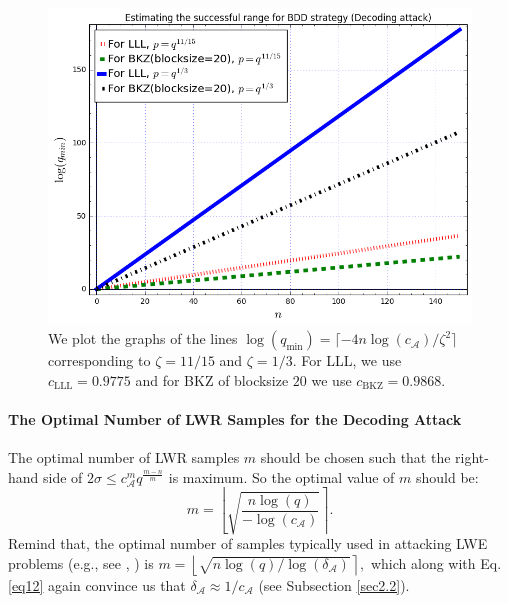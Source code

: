 \documentclass{cta-author}
\begin{document}
\begin{figure}[t]
	\centering
	\includegraphics[scale=0.437, bb=0 0 560 430]{picture.png}
	\caption{We plot the graphs of the lines $\log (q_{\text{min}})=\lceil-4n  \log (c_{\mathcal{A}})/\zeta^2 \rceil$ corresponding to $\zeta=11/15$ and $\zeta=1/3$. For LLL, we use $c_{\text{LLL}}=0.9775$ and for BKZ of blocksize $20$ we use $c_{\text{BKZ}}=0.9868$.}
	\label{fig:success_range}
\end{figure}
\paragraph{The Optimal Number of LWR Samples for the Decoding Attack}
The optimal number of LWR samples $m$ should be chosen such that the right-hand side of
$2\sigma \leq c_{\mathcal{A}} ^{m} q^{\frac{m-n}{m}}$ is maximum.
So the optimal value of $m$ should be:
\begin{equation}\label{eq12} 
m=\left \lfloor \sqrt{\frac{n\log (q)}{- \log (c_{\mathcal{A}})}} \right\rceil.
\end{equation}
Remind that, the optimal number of samples typically used in attacking LWE problems (e.g., see \cite{LP11}, \cite{MR09}) is
$m=\left \lfloor \sqrt{n\log (q)/\log (\delta_{\mathcal{A}})} \right\rceil,$
which along with Eq. \eqref{eq12} again convince us that $\delta_{\mathcal{A}} \approx 1/c_{\mathcal{A}}$ (see Subsection \ref{sec2.2}).
\end{document}
